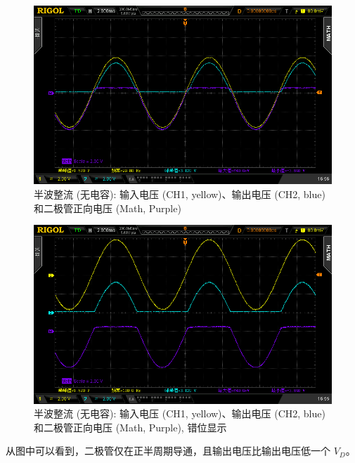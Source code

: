\documentclass[UTF8]{article}
\begin{document}
\begin{figure}[H]\centering
    \includegraphics[width=\columnwidth]{LCE-01-二极管/assets/二极管整流电路/半波整流 单二极管 无电容 输出解电阻.png}
    \caption{半波整流 (无电容): 输入电压 (CH1, yellow)、输出电压 (CH2, blue) 和二极管正向电压 (Math, Purple)}
\end{figure}

\begin{figure}[H]\centering
    \includegraphics[width=\columnwidth]{LCE-01-二极管/assets/二极管整流电路/半波整流 单二极管 无电容 输出解电阻 (错位).png}
    \caption{半波整流 (无电容): 输入电压 (CH1, yellow)、输出电压 (CH2, blue) 和二极管正向电压 (Math, Purple), 错位显示}
\end{figure}

从图中可以看到，二极管仅在正半周期导通，且输出电压比输出电压低一个 $V_D$。
\end{document}
